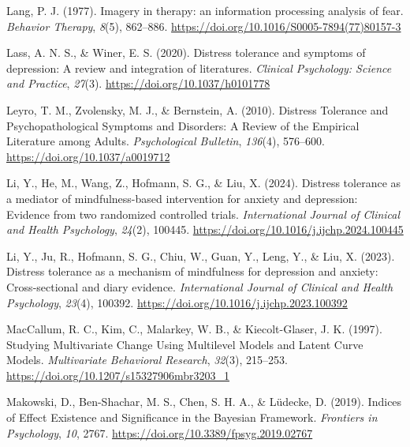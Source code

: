 \documentclass[
  man,floatsintext]{apa7}
\newlength{\cslhangindent}
\newlength{\cslentryspacingunit} %
\newenvironment{CSLReferences}[2] %
 {%
  \setlength{\parindent}{0pt}
  \ifodd #1
  \let\oldpar\par
  \def\par{\hangindent=\cslhangindent\oldpar}
  \fi
  \setlength{\parskip}{#2\cslentryspacingunit}
 }%
 {}
\begin{document}
\begin{CSLReferences}{1}{0}
\leavevmode{}%
Lang, P. J. (1977). Imagery in therapy: an information processing analysis of fear. \emph{Behavior Therapy}, \emph{8}(5), 862--886. \url{https://doi.org/10.1016/S0005-7894(77)80157-3}

\leavevmode{}%
Lass, A. N. S., \& Winer, E. S. (2020). Distress tolerance and symptoms of depression: A review and integration of literatures. \emph{Clinical Psychology: Science and Practice}, \emph{27}(3). \url{https://doi.org/10.1037/h0101778}

\leavevmode{}%
Leyro, T. M., Zvolensky, M. J., \& Bernstein, A. (2010). Distress Tolerance and Psychopathological Symptoms and Disorders: A Review of the Empirical Literature among Adults. \emph{Psychological Bulletin}, \emph{136}(4), 576--600. \url{https://doi.org/10.1037/a0019712}

\leavevmode{}%
Li, Y., He, M., Wang, Z., Hofmann, S. G., \& Liu, X. (2024). Distress tolerance as a mediator of mindfulness-based intervention for anxiety and depression: Evidence from two randomized controlled trials. \emph{International Journal of Clinical and Health Psychology}, \emph{24}(2), 100445. \url{https://doi.org/10.1016/j.ijchp.2024.100445}

\leavevmode{}%
Li, Y., Ju, R., Hofmann, S. G., Chiu, W., Guan, Y., Leng, Y., \& Liu, X. (2023). Distress tolerance as a mechanism of mindfulness for depression and anxiety: Cross-sectional and diary evidence. \emph{International Journal of Clinical and Health Psychology}, \emph{23}(4), 100392. \url{https://doi.org/10.1016/j.ijchp.2023.100392}

\leavevmode{}%
MacCallum, R. C., Kim, C., Malarkey, W. B., \& Kiecolt-Glaser, J. K. (1997). Studying Multivariate Change Using Multilevel Models and Latent Curve Models. \emph{Multivariate Behavioral Research}, \emph{32}(3), 215--253. \url{https://doi.org/10.1207/s15327906mbr3203_1}

\leavevmode{}%
Makowski, D., Ben-Shachar, M. S., Chen, S. H. A., \& Lüdecke, D. (2019). Indices of Effect Existence and Significance in the Bayesian Framework. \emph{Frontiers in Psychology}, \emph{10}, 2767. \url{https://doi.org/10.3389/fpsyg.2019.02767}


\end{CSLReferences}
\end{document}

